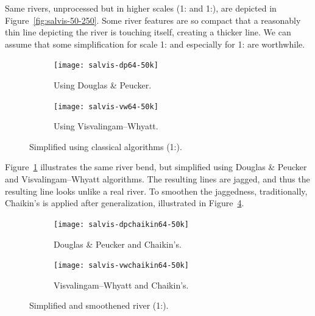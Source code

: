 \documentclass[a4paper]{article}
\newcommand{\DP}{Douglas \& Peucker}
\newcommand{\VW}{Visvalingam--Whyatt}
\begin{document}
Same rivers, unprocessed but in higher scales (1: and
1:), are depicted in Figure~\ref{fig:salvis-50-250}. Some
river features are so compact that a reasonably thin line depicting the river
is touching itself, creating a thicker line. We can assume that some
simplification for scale 1: and especially for
1: are worthwhile.

\begin{figure}[ht]
    \centering
    \begin{subfigure}[b]{.49\textwidth}
        \texttt{[image: salvis-dp64-50k]}
        \caption{Using {\DP}.}
    \end{subfigure}
    \hfill
    \begin{subfigure}[b]{.49\textwidth}
        \texttt{[image: salvis-vw64-50k]}
        \caption{Using {\VW}.}
    \end{subfigure}
    \caption{Simplified using classical algorithms (1:).}
    \label{fig:salvis-generalized-50k}
\end{figure}

Figure~\ref{fig:salvis-generalized-50k} illustrates the same river bend, but
simplified using {\DP} and {\VW} algorithms. The resulting lines are jagged,
and thus the resulting line looks unlike a real river. To smoothen the jaggedness,
traditionally, Chaikin's\cite{chaikin1974algorithm} is applied after
generalization, illustrated in Figure~\ref{fig:salvis-generalized-chaikin-50k}.

\begin{figure}[ht!]
    \centering
    \begin{subfigure}[b]{.49\textwidth}
        \texttt{[image: salvis-dpchaikin64-50k]}
        \caption{{\DP} and Chaikin's.}
        \label{fig:salvis-dpchaikin64-50k}
    \end{subfigure}
    \hfill
    \begin{subfigure}[b]{.49\textwidth}
        \texttt{[image: salvis-vwchaikin64-50k]}
        \caption{{\VW} and Chaikin's.}
        \label{fig:salvis-vwchaikin64-50k}
    \end{subfigure}
    \caption{Simplified and smoothened river (1:).}
    \label{fig:salvis-generalized-chaikin-50k}
\end{figure}
\end{document}
